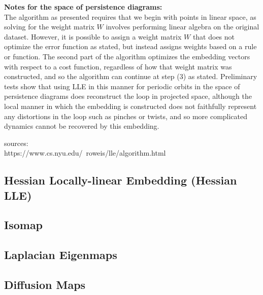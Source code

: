\documentclass{gtpart}
\theoremstyle{definition}
\begin{document}
{\bf Notes for the space of persistence diagrams:}\\
The algorithm as presented requires that we begin with points in linear space, as solving for the weight matrix $W$ involves performing linear algebra on the original dataset. However, it is possible to assign a weight matrix $W$ that does not optimize the error function as stated, but instead assigns weights based on a rule or function. The second part of the algorithm optimizes the embedding vectors with respect to a cost function, regardless of how that weight matrix was constructed, and so the algorithm can continue at step (3) as stated. Preliminary tests show that using LLE in this manner for periodic orbits in the space of persistence diagrams does reconstruct the loop in projected space, although the local manner in which the embedding is constructed does not faithfully represent any distortions in the loop such as pinches or twists, and so more complicated dynamics cannot be recovered by this embedding.


sources:\\
https://www.cs.nyu.edu/~roweis/lle/algorithm.html

\subsection{Hessian Locally-linear Embedding (Hessian LLE)}

\subsection{Isomap}

\subsection{Laplacian Eigenmaps}

\subsection{Diffusion Maps}
\end{document}
